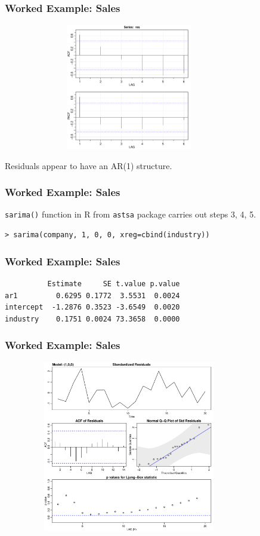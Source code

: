 \documentclass[%
xcolor=pdftex]{beamer}
\begin{document}
\begin{frame}
\frametitle{Worked Example: Sales}

\includegraphics[width=110mm, height=55mm]{acfs.pdf}

Residuals appear to have an AR(1) structure.

\end{frame}

\begin{frame}[fragile]
\frametitle{Worked Example: Sales}

\verb=sarima()= function in R from \verb=astsa= package carries out steps 3, 4, 5. 

\begin{verbatim}
> sarima(company, 1, 0, 0, xreg=cbind(industry))
\end{verbatim}


\end{frame}



\begin{frame}[fragile]
\frametitle{Worked Example: Sales}


\begin{verbatim}
          Estimate     SE t.value p.value
ar1         0.6295 0.1772  3.5531  0.0024
intercept  -1.2876 0.3523 -3.6549  0.0020
industry    0.1751 0.0024 73.3658  0.0000
\end{verbatim}


\end{frame}

\begin{frame}
\frametitle{Worked Example: Sales}


\includegraphics[width=110mm, height=75mm]{diag1.pdf}



\end{frame}
\end{document}
